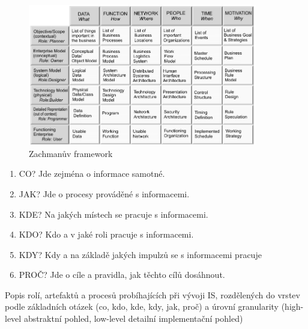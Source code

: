 \documentclass[10pt,a4paper]{article}
\begin{document}
\begin{figure}[ht]
    \centering
    \includegraphics[width=10cm]{zachman.jpg}
    \caption{Zachmanův framework}
    \label{fig:zachman}
\end{figure}
\begin{enumerate}
\item CO? Jde zejména o informace samotné.
\item JAK? Jde o procesy prováděné s informacemi.
\item KDE? Na jakých místech se pracuje s informacemi.
\item KDO? Kdo a v jaké roli pracuje s informacemi.
\item KDY? Kdy a na základě jakých impulzů se s informacemi pracuje
\item PROČ? Jde o cíle a pravidla, jak těchto cílů dosáhnout.
\end{enumerate}
Popis rolí, artefaktů a procesů probíhajících při vývoji IS, rozdělených do vrstev podle základních otázek (co, kdo, kde, kdy, jak, proč) a úrovní granularity (high-level abstraktní pohled, low-level detailní implementační pohled)
\end{document}
